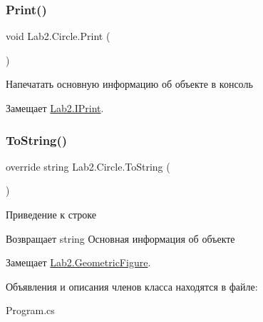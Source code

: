 \subsubsection{\texorpdfstring{Print()}{Print()}}
{\footnotesize\ttfamily void Lab2.\+Circle.\+Print (\begin{DoxyParamCaption}{ }\end{DoxyParamCaption})}

Напечатать основную информацию об объекте в консоль 

Замещает \hyperlink{interface_lab2_1_1_i_print}{Lab2.\+I\+Print}.

\mbox{\label{class_lab2_1_1_circle_ab2ed9c25791cb878a8a8d8857786917d}} 
\subsubsection{\texorpdfstring{To\+String()}{ToString()}}
{\footnotesize\ttfamily override string Lab2.\+Circle.\+To\+String (\begin{DoxyParamCaption}{ }\end{DoxyParamCaption})\hspace{0.3cm}{\ttfamily [virtual]}}

Приведение к строке \begin{DoxyReturn}{Возвращает}
string Основная информация об объекте 
\end{DoxyReturn}


Замещает \hyperlink{class_lab2_1_1_geometric_figure}{Lab2.\+Geometric\+Figure}.



Объявления и описания членов класса находятся в файле\+:\begin{DoxyCompactItemize}
\item 
Program.\+cs\end{DoxyCompactItemize}
